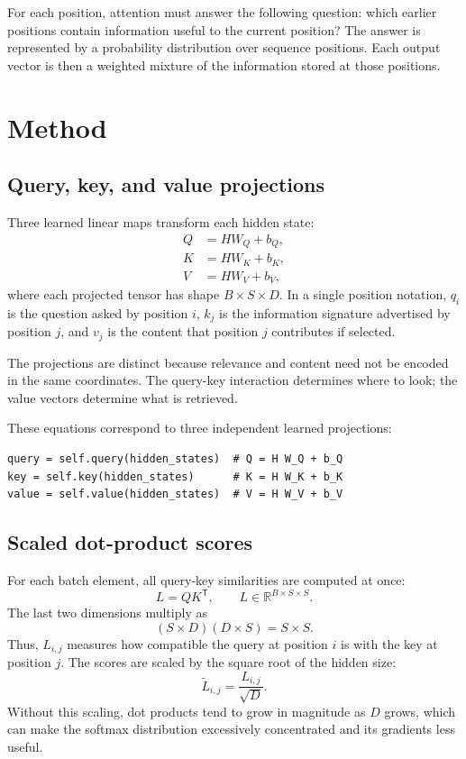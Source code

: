 \documentclass[11pt]{article}
\begin{document}
For each position, attention must answer the following question: which earlier
positions contain information useful to the current position? The answer is
represented by a probability distribution over sequence positions. Each output
vector is then a weighted mixture of the information stored at those positions.

\section{Method}

\subsection{Query, key, and value projections}
Three learned linear maps transform each hidden state:
\begin{align}
Q &= HW_Q + b_Q,\\
K &= HW_K + b_K,\\
V &= HW_V + b_V,
\end{align}
where each projected tensor has shape $B\times S\times D$. In a single
position notation, $q_i$ is the question asked by position $i$, $k_j$ is the
information signature advertised by position $j$, and $v_j$ is the content
that position $j$ contributes if selected.

The projections are distinct because relevance and content need not be encoded
in the same coordinates. The query-key interaction determines where to look;
the value vectors determine what is retrieved.

These equations correspond to three independent learned projections:

\begin{lstlisting}
query = self.query(hidden_states)  # Q = H W_Q + b_Q
key = self.key(hidden_states)      # K = H W_K + b_K
value = self.value(hidden_states)  # V = H W_V + b_V
\end{lstlisting}

\subsection{Scaled dot-product scores}
For each batch element, all query-key similarities are computed at once:
\[
L = QK^\mathsf{T}, \qquad L\in\mathbb{R}^{B\times S\times S}.
\]
The last two dimensions multiply as
\[
(S\times D)(D\times S)=S\times S.
\]
Thus, $L_{i,j}$ measures how compatible the query at position $i$ is with the
key at position $j$. The scores are scaled by the square root of the hidden
size:
\[
\widetilde{L}_{i,j}=\frac{L_{i,j}}{\sqrt{D}}.
\]
Without this scaling, dot products tend to grow in magnitude as $D$ grows,
which can make the softmax distribution excessively concentrated and its
gradients less useful.
\end{document}

